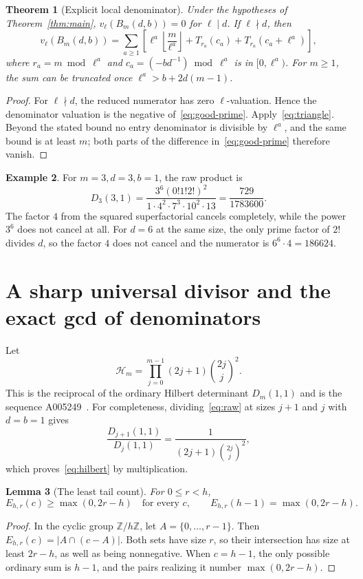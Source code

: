 \documentclass[11pt,a4paper]{article}
\newtheorem{theorem}{Theorem}[section]
\newtheorem{lemma}[theorem]{Lemma}
\theoremstyle{definition}
\newtheorem{example}[theorem]{Example}
\theoremstyle{remark}
\newcommand{\Z}{\mathbb Z}
\newcommand{\HH}{\mathcal H}
\newcommand{\floor}[1]{\left\lfloor #1\right\rfloor}
\begin{document}
\begin{theorem}[Explicit local denominator]
\label{thm:den}
Under the hypotheses of Theorem~\ref{thm:main}, $v_\ell(B_m(d,b))=0$
for $\ell\mid d$. If $\ell\nmid d$, then
\begin{equation}
 v_\ell(B_m(d,b))=
 \sum_{a\ge1}\left[
 \ell^a\floor{\frac m{\ell^a}}
 +T_{r_a}(c_a)+T_{r_a}(c_a+\ell^a)\right],
 \label{eq:den-local}
\end{equation}
where $r_a=m\bmod\ell^a$ and
$c_a=(-bd^{-1})\bmod\ell^a$ is in $[0,\ell^a)$.
For $m\ge1$, the sum can be truncated once
$\ell^a>b+2d(m-1)$.
\end{theorem}
\begin{proof}
For $\ell\nmid d$, the reduced numerator has zero $\ell$-valuation.
Hence the denominator valuation is the negative of~\eqref{eq:good-prime}.
Apply~\eqref{eq:triangle}. Beyond the stated bound no entry denominator
is divisible by $\ell^a$, and the same bound is at least $m$; both parts
of the difference in~\eqref{eq:good-prime} therefore vanish.
\end{proof}

\begin{example}
For $m=3,d=3,b=1$, the raw product is
\[
 D_3(3,1)
 =\frac{3^6(0!1!2!)^2}{1\cdot4^2\cdot7^3\cdot10^2\cdot13}
 =\frac{729}{1783600}.
\]
The factor $4$ from the squared superfactorial cancels completely, while
the power $3^6$ does not cancel at all. For $d=6$ at the same size, the only
prime factor of $2!$ divides $d$, so the factor $4$ does not cancel and the
numerator is $6^6\cdot4=186624$.
\end{example}

\section{A sharp universal divisor and the exact gcd of denominators}
\label{sec:gcd}

Let
\begin{equation}
 \HH_m=\prod_{j=0}^{m-1}(2j+1)\binom{2j}{j}^{\!2}.
 \label{eq:hilbert}
\end{equation}
This is the reciprocal of the ordinary Hilbert determinant
$D_m(1,1)$ and is the sequence A005249~\cite{oeis5249}.
For completeness, dividing~\eqref{eq:raw} at sizes $j+1$ and $j$
with $d=b=1$ gives
\[
 \frac{D_{j+1}(1,1)}{D_j(1,1)}
 =\frac1{(2j+1)\binom{2j}{j}^2},
\]
which proves~\eqref{eq:hilbert} by multiplication.

\begin{lemma}[The least tail count]
\label{lem:min-tail}
For $0\le r<h$,
\[
 E_{h,r}(c)\ge\max(0,2r-h)
 \quad\text{for every }c,
 \qquad E_{h,r}(h-1)=\max(0,2r-h).
\]
\end{lemma}
\begin{proof}
In the cyclic group $\Z/h\Z$, let $A=\{0,\ldots,r-1\}$. Then
$E_{h,r}(c)=|A\cap(c-A)|$. Both sets have size $r$, so their intersection
has size at least $2r-h$, as well as being nonnegative. When $c=h-1$,
the only possible ordinary sum is $h-1$, and the pairs realizing it number
$\max(0,2r-h)$.
\end{proof}
\end{document}
